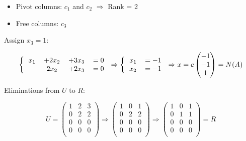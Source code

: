 \documentclass[12pt]{article}
\begin{document}
\begin{itemize}
    \item Pivot columns: $c_1$ and $c_2$ $\Rightarrow$ Rank = 2
    \item Free columns: $c_3$
\end{itemize}

Assign $x_3=1$:

\[
\left \{
  \begin{tabular}{cccc}
  $x_1$ & $+2x_2$ & $+3x_3$ & $=0$\\
  & $2x_2$ & $+2x_3$ & $=0$\\
  \end{tabular}
\right
.\Rightarrow
\left \{
  \begin{tabular}{cc}
  $x_1$ & $=-1$\\
  $x_2$ & $=-1$\\
  \end{tabular}
\right
.\Rightarrow
x=c
\left(
    \begin{matrix}
        -1\\
        -1\\
        1\\
    \end{matrix}
\right)
=N(A)
\]

Eliminations from $U$ to $R$:

\[
U=
\left(
    \begin{matrix}
        \boxed{1} & 2 & 3\\
        0 & \boxed{2} & 2\\
        0 & 0 & 0\\
        0 & 0 & 0\\
    \end{matrix}
\right)
\Rightarrow
\left(
    \begin{matrix}
        \boxed{1} & 0 & 1\\
        0 & \boxed{2} & 2\\
        0 & 0 & 0\\
        0 & 0 & 0\\
    \end{matrix}
\right)
\Rightarrow
\left(
    \begin{matrix}
        \boxed{1} & 0 & 1\\
        0 & \boxed{1} & 1\\
        0 & 0 & 0\\
        0 & 0 & 0\\
    \end{matrix}
\right)
=R
\]

\newpage
\end{document}
